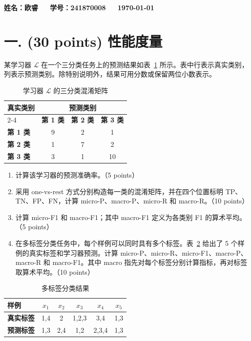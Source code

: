\documentclass[8pt]{article}
\begin{document}
\textbf{\color{blue}\Large
姓名：欧睿\ \ \ 学号：241870008\ \ \ \today}

\section*{一. (30 points) 性能度量}

某学习器 $\mathcal{L}$ 在一个三分类任务上的预测结果如表~\ref{tab:confusion} 所示。表中行表示真实类别，列表示预测类别。除特别说明外，结果可用分数或保留两位小数表示。

\begin{table}[H]
\centering
\begin{tabular}{lccc}
\toprule
\multirow{2}{*}{\textbf{真实类别}} & \multicolumn{3}{c}{\textbf{预测类别}} \\
\cmidrule(lr){2-4}
 & \textbf{第 1 类} & \textbf{第 2 类} & \textbf{第 3 类} \\
\midrule
\textbf{第 1 类} & 9 & 2 & 1 \\
\textbf{第 2 类} & 1 & 7 & 2 \\
\textbf{第 3 类} & 3 & 1 & 10 \\
\bottomrule
\end{tabular}
\caption{学习器 $\mathcal{L}$ 的三分类混淆矩阵}
\label{tab:confusion}
\end{table}

\begin{enumerate}[leftmargin=2.2em,itemsep=0.45em]
  \item 计算该学习器的预测准确率。（5 points）
  \item 采用 one-vs-rest 方式分别构造每一类的混淆矩阵，并在四个位置标明 TP、TN、FP、FN，计算 micro-P、macro-P、micro-R 和 macro-R。（10 points）
  \item 计算 micro-F1 和 macro-F1；其中 macro-F1 定义为各类别 F1 的算术平均。（5 points）
  \item 在多标签分类任务中，每个样例可以同时具有多个标签。表~\ref{tab:multilabel} 给出了 5 个样例的真实标签和学习器预测。计算 micro-P、micro-R、micro-F1、macro-P、macro-R 和 macro-F1。其中 macro 指先对每个标签分别计算指标，再对标签取算术平均。（10 points）
\end{enumerate}

\begin{table}[H]
\centering
\begin{tabular}{lccccc}
\toprule
\textbf{样例} & $x_1$ & $x_2$ & $x_3$ & $x_4$ & $x_5$ \\
\midrule
\textbf{真实标签} & 1,4 & 2 & 1,2,3 & 3,4 & 1,3 \\
\textbf{预测标签} & 1,3 & 2,4 & 1,2 & 2,3,4 & 1,3 \\
\bottomrule
\end{tabular}
\caption{多标签分类结果}
\label{tab:multilabel}
\end{table}
\end{document}
